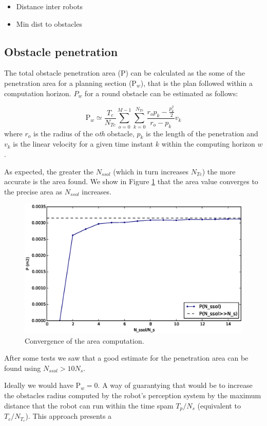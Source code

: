 \begin{itemize}
 \item Distance inter robots
 \item Min dist to obstacles
\end{itemize}

\clearpage
\subsection{Obstacle penetration} \hspace{0pt}

The total obstacle penetration area ($\mathrm{P}$) can be calculated as the some of the penetration area for a planning section ($\mathrm{P}_w$), that is the plan followed within a computation horizon. $P_w$ for a round obstacle can be estimated as follows:

\[
\mathrm{P}_w \simeq \frac{T_c}{N_{Tc}} \sum _{o=0}^{M-1} \sum_{k=0}^{N_{Tc}} \frac{r_op_k - \frac{p_k^2}{2}}{r_o-p_k} v_k
\]
where $r_o$ is the radius of the o\textit{th} obstacle, $p_k$ is the length of the penetration and $v_k$ is the linear velocity for a given time instant $k$ within the computing horizon $w$.

As expected, the greater the $N_{ssol}$ (which in turn increases $N_{Tc}$) the more accurate is the area found. We show in Figure \ref{fig:pen-conv} that the area value converges to the precise area as $N_{ssol}$ increases.

 \begin{figure}[!h]
 	\centering
 	\includegraphics[width=.6\textwidth]{./img/penetration/pen-nssol.eps}
 	\caption{Convergence of the area computation.\label{fig:pen-conv}}
 \end{figure}

After some tests we saw that a good estimate for the penetration area can be found using $N_{ssol} > 10N_s$.

Ideally we would have $\mathrm{P}_w = 0$. A way of guarantying that would be to increase the obstacles radius computed by the robot's perception system by the maximum distance that the robot can run within the time spam $T_p/N_s$ (equivalent to $T_c/N_{T_c}$). This approach presents a 

